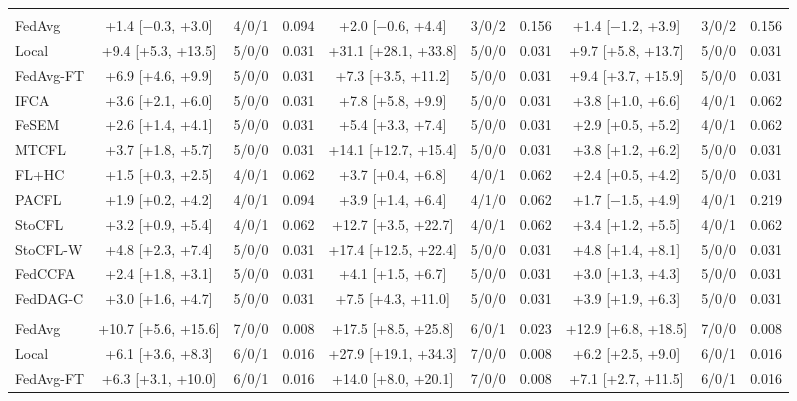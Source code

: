 {{\begin{tabular}{l c c c c c c c c c}
\addlinespace
\multicolumn{10}{l}{\textit{(b) Realistic benchmarks}} \\
FedAvg & +1.4 [$-$0.3, +3.0] & 4/0/1 & 0.094 & +2.0 [$-$0.6, +4.4] & 3/0/2 & 0.156 & +1.4 [$-$1.2, +3.9] & 3/0/2 & 0.156 \\
Local & +9.4 [+5.3, +13.5] & 5/0/0 & 0.031 & +31.1 [+28.1, +33.8] & 5/0/0 & 0.031 & +9.7 [+5.8, +13.7] & 5/0/0 & 0.031 \\
FedAvg-FT & +6.9 [+4.6, +9.9] & 5/0/0 & 0.031 & +7.3 [+3.5, +11.2] & 5/0/0 & 0.031 & +9.4 [+3.7, +15.9] & 5/0/0 & 0.031 \\
IFCA & +3.6 [+2.1, +6.0] & 5/0/0 & 0.031 & +7.8 [+5.8, +9.9] & 5/0/0 & 0.031 & +3.8 [+1.0, +6.6] & 4/0/1 & 0.062 \\
FeSEM & +2.6 [+1.4, +4.1] & 5/0/0 & 0.031 & +5.4 [+3.3, +7.4] & 5/0/0 & 0.031 & +2.9 [+0.5, +5.2] & 4/0/1 & 0.062 \\
MTCFL & +3.7 [+1.8, +5.7] & 5/0/0 & 0.031 & +14.1 [+12.7, +15.4] & 5/0/0 & 0.031 & +3.8 [+1.2, +6.2] & 5/0/0 & 0.031 \\
FL+HC & +1.5 [+0.3, +2.5] & 4/0/1 & 0.062 & +3.7 [+0.4, +6.8] & 4/0/1 & 0.062 & +2.4 [+0.5, +4.2] & 5/0/0 & 0.031 \\
PACFL & +1.9 [+0.2, +4.2] & 4/0/1 & 0.094 & +3.9 [+1.4, +6.4] & 4/1/0 & 0.062 & +1.7 [$-$1.5, +4.9] & 4/0/1 & 0.219 \\
StoCFL & +3.2 [+0.9, +5.4] & 4/0/1 & 0.062 & +12.7 [+3.5, +22.7] & 4/0/1 & 0.062 & +3.4 [+1.2, +5.5] & 4/0/1 & 0.062 \\
StoCFL-W & +4.8 [+2.3, +7.4] & 5/0/0 & 0.031 & +17.4 [+12.5, +22.4] & 5/0/0 & 0.031 & +4.8 [+1.4, +8.1] & 5/0/0 & 0.031 \\
FedCCFA & +2.4 [+1.8, +3.1] & 5/0/0 & 0.031 & +4.1 [+1.5, +6.7] & 5/0/0 & 0.031 & +3.0 [+1.3, +4.3] & 5/0/0 & 0.031 \\
FedDAG-C & +3.0 [+1.6, +4.7] & 5/0/0 & 0.031 & +7.5 [+4.3, +11.0] & 5/0/0 & 0.031 & +3.9 [+1.9, +6.3] & 5/0/0 & 0.031 \\
\addlinespace
\multicolumn{10}{l}{\textit{(c) Additional benchmarks}} \\
FedAvg & +10.7 [+5.6, +15.6] & 7/0/0 & 0.008 & +17.5 [+8.5, +25.8] & 6/0/1 & 0.023 & +12.9 [+6.8, +18.5] & 7/0/0 & 0.008 \\
Local & +6.1 [+3.6, +8.3] & 6/0/1 & 0.016 & +27.9 [+19.1, +34.3] & 7/0/0 & 0.008 & +6.2 [+2.5, +9.0] & 6/0/1 & 0.016 \\
FedAvg-FT & +6.3 [+3.1, +10.0] & 6/0/1 & 0.016 & +14.0 [+8.0, +20.1] & 7/0/0 & 0.008 & +7.1 [+2.7, +11.5] & 6/0/1 & 0.016 \\

\end{tabular}}}
